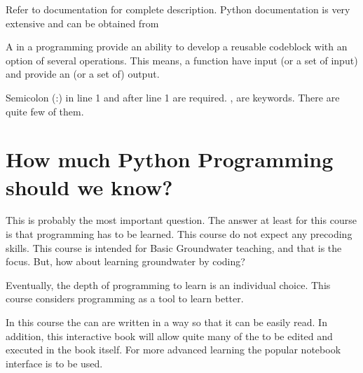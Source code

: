 \documentclass[letterpaper,10pt,english]{sphinxmanual}
\let\sphinxpxdimen\pdfpxdimen\else\newdimen\sphinxpxdimen
\begin{document}

\noindent\sphinxincludegraphics[width=600\sphinxpxdimen]{{bg1_f3}.png}


Refer to  documentation for complete description. Python documentation is very extensive and can be obtained from 

\noindent\sphinxincludegraphics[width=600\sphinxpxdimen]{{bg1_f4}.png}


A  in a programming provide an ability to develop a reusable code\sphinxhyphen{}block with an option of several operations. This means, a function have input (or a set of input) and provide an (or a set of) output.

\noindent\sphinxincludegraphics[width=600\sphinxpxdimen]{{bg1_f5}.png}

Semicolon (:) in line 1 and  after line 1 are required. ,  are  keywords. There are quite few of them.


\section{How much Python Programming should we know?}
\label{\detokenize{contents/background/01_python:how-much-python-programming-should-we-know}}
This is probably the most important question. The  answer at least for this course is that  programming has to be learned.
This course do not expect any pre\sphinxhyphen{}coding skills. This course is intended for Basic Groundwater teaching, and that is the focus.
But, how about learning groundwater by coding?

Eventually, the depth of programming to learn is an individual choice. This course considers programming as a tool to learn better.

In this course the  can are written in a way so that it can be easily read. In addition, this interactive book will allow quite many of the  to be edited and executed in the book itself. For more advanced learning the popular notebook interface  is to be used.
\end{document}

